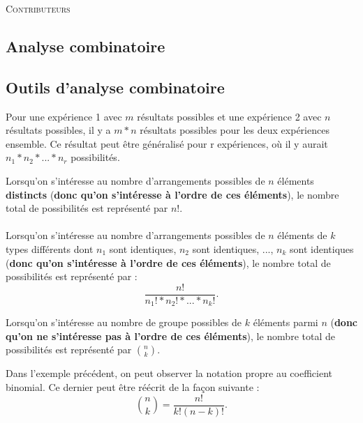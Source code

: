 \documentclass[10pt, french]{article}
\begin{document}
\begin{center}
	\textsc{\Large Contributeurs}\\[0.5cm] 
\end{center}


\newpage

\begin{multicols*}{2}

\section{Analyse combinatoire}
\subsection{Outils d'analyse combinatoire}
\begin{definitionNOHFILL}
Pour une expérience 1 avec $m$ résultats possibles et une expérience 2 avec $n$ résultats possibles, il y a $m * n$ résultats possibles pour les deux expériences ensemble. Ce résultat peut être généralisé pour r expériences, où il y aurait $n_1*n_2*...{}*n_r$ possibilités.
\end{definitionNOHFILL}

\begin{definitionNOHFILL}[Permutations]
Lorsqu'on s'intéresse au nombre d'arrangements possibles de $n$ éléments \textbf{distincts} (\textbf{donc qu'on s'intéresse à l'ordre de ces éléments}), le nombre total de possibilités est représenté par $n!$.\\
\\
Lorsqu'on s'intéresse au nombre d'arrangements possibles de $n$ éléments de $k$ types différents dont $n_1$ sont identiques, $n_2$ sont identiques, ..., $n_k$ sont identiques (\textbf{donc qu'on s'intéresse à l'ordre de ces éléments}), le nombre total de possibilités est représenté par : $$\frac{n!}{n_1!*n_2!* ... *n_k!}.$$
\end{definitionNOHFILL}

\begin{definitionNOHFILL}[Combinaisons]
Lorsqu'on s'intéresse au nombre de groupe possibles de $k$ éléments parmi $n$ (\textbf{donc qu'on ne s'intéresse pas à l'ordre de ces éléments}), le nombre total de possibilités est représenté par $\binom{n}{k}$.
\end{definitionNOHFILL}

\begin{distributions}[Notation]
Dans l'exemple précédent, on peut observer la notation propre au coefficient binomial. Ce dernier peut être réécrit de la façon suivante : $$\binom{n}{k} = \frac{n!}{k!(n-k)!}.$$
\end{distributions}


\end{multicols*}
\end{document}
